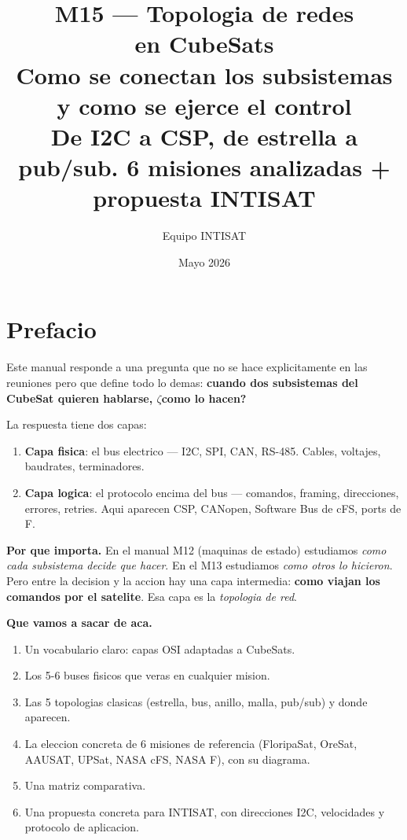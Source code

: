 \documentclass[11pt,a4paper,oneside,openright]{book}
\title{\Huge\bfseries M15 --- Topologia de redes\\[0.3em]
  \LARGE en CubeSats\\[0.5em]
  \large Como se conectan los subsistemas y como se ejerce el control\\
  \normalsize De I2C a CSP, de estrella a pub/sub. 6 misiones analizadas + propuesta INTISAT}
\author{Equipo INTISAT}
\date{Mayo 2026}
\begin{document}
\frontmatter
\maketitle

\chapter*{Prefacio}

Este manual responde a una pregunta que no se hace explicitamente
en las reuniones pero que define todo lo demas: \textbf{cuando dos
subsistemas del CubeSat quieren hablarse, $\zeta$como lo hacen?}

La respuesta tiene dos capas:

\begin{enumerate}[leftmargin=2em]
  \item \textbf{Capa fisica}: el bus electrico --- I2C, SPI, CAN, RS-485.
    Cables, voltajes, baudrates, terminadores.
  \item \textbf{Capa logica}: el protocolo encima del bus --- comandos,
    framing, direcciones, errores, retries. Aqui aparecen CSP, CANopen,
    Software Bus de cFS, ports de F\textquotesingle{}.
\end{enumerate}

\textbf{Por que importa.} En el manual M12 (maquinas de estado)
estudiamos \emph{como cada subsistema decide que hacer}. En el M13
estudiamos \emph{como otros lo hicieron}. Pero entre la decision
y la accion hay una capa intermedia: \textbf{como viajan los
comandos por el satelite}. Esa capa es la \emph{topologia de red}.

\textbf{Que vamos a sacar de aca.}

\begin{enumerate}[leftmargin=2em]
  \item Un vocabulario claro: capas OSI adaptadas a CubeSats.
  \item Los 5-6 buses fisicos que veras en cualquier mision.
  \item Las 5 topologias clasicas (estrella, bus, anillo, malla,
    pub/sub) y donde aparecen.
  \item La eleccion concreta de 6 misiones de referencia (FloripaSat,
    OreSat, AAUSAT, UPSat, NASA cFS, NASA F\textquotesingle{}), con su diagrama.
  \item Una matriz comparativa.
  \item Una propuesta concreta para INTISAT, con direcciones I2C,
    velocidades y protocolo de aplicacion.
\end{enumerate}
\end{document}
